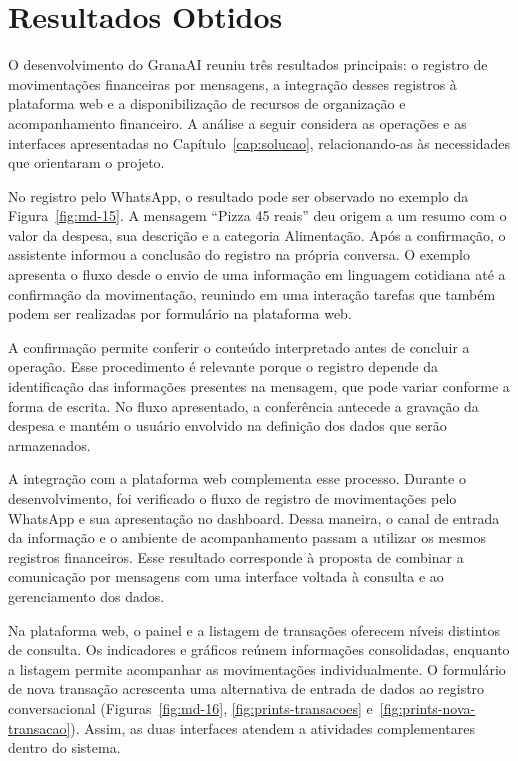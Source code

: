 \chapter{Resultados Obtidos}
\label{cap:resultados}

O desenvolvimento do GranaAI reuniu três resultados principais: o registro de movimentações financeiras por mensagens, a integração desses registros à plataforma web e a disponibilização de recursos de organização e acompanhamento financeiro. A análise a seguir considera as operações e as interfaces apresentadas no Capítulo~\ref{cap:solucao}, relacionando-as às necessidades que orientaram o projeto.

No registro pelo WhatsApp, o resultado pode ser observado no exemplo da Figura~\ref{fig:md-15}. A mensagem ``Pizza 45 reais'' deu origem a um resumo com o valor da despesa, sua descrição e a categoria Alimentação. Após a confirmação, o assistente informou a conclusão do registro na própria conversa. O exemplo apresenta o fluxo desde o envio de uma informação em linguagem cotidiana até a confirmação da movimentação, reunindo em uma interação tarefas que também podem ser realizadas por formulário na plataforma web.

A confirmação permite conferir o conteúdo interpretado antes de concluir a operação. Esse procedimento é relevante porque o registro depende da identificação das informações presentes na mensagem, que pode variar conforme a forma de escrita. No fluxo apresentado, a conferência antecede a gravação da despesa e mantém o usuário envolvido na definição dos dados que serão armazenados.

A integração com a plataforma web complementa esse processo. Durante o desenvolvimento, foi verificado o fluxo de registro de movimentações pelo WhatsApp e sua apresentação no dashboard. Dessa maneira, o canal de entrada da informação e o ambiente de acompanhamento passam a utilizar os mesmos registros financeiros. Esse resultado corresponde à proposta de combinar a comunicação por mensagens com uma interface voltada à consulta e ao gerenciamento dos dados.

Na plataforma web, o painel e a listagem de transações oferecem níveis distintos de consulta. Os indicadores e gráficos reúnem informações consolidadas, enquanto a listagem permite acompanhar as movimentações individualmente. O formulário de nova transação acrescenta uma alternativa de entrada de dados ao registro conversacional (Figuras~\ref{fig:md-16}, \ref{fig:prints-transacoes} e~\ref{fig:prints-nova-transacao}). Assim, as duas interfaces atendem a atividades complementares dentro do sistema.

